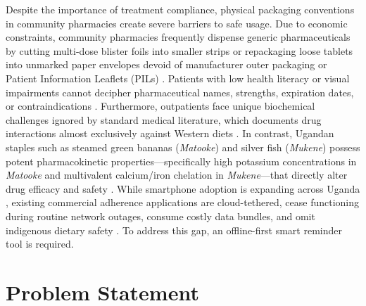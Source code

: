 Despite the importance of treatment compliance, physical packaging conventions in community pharmacies create severe barriers to safe usage. Due to economic constraints, community pharmacies frequently dispense generic pharmaceuticals by cutting multi-dose blister foils into smaller strips or repackaging loose tablets into unmarked paper envelopes devoid of manufacturer outer packaging or Patient Information Leaflets (PILs) \cite{who2017medication, nda2024register}. Patients with low health literacy or visual impairments cannot decipher pharmaceutical names, strengths, expiration dates, or contraindications \cite{parker2016health}. Furthermore, outpatients face unique biochemical challenges ignored by standard medical literature, which documents drug interactions almost exclusively against Western diets \cite{bushra2011food, bailey2013grapefruit}. In contrast, Ugandan staples such as steamed green bananas (\textit{Matooke}) and silver fish (\textit{Mukene}) possess potent pharmacokinetic properties---specifically high potassium concentrations in \textit{Matooke} and multivalent calcium/iron chelation in \textit{Mukene}---that directly alter drug efficacy and safety \cite{fao2019food, bushra2011food}. While smartphone adoption is expanding across Uganda \cite{dayer2013smartphone}, existing commercial adherence applications are cloud-tethered, cease functioning during routine network outages, consume costly data bundles, and omit indigenous dietary safety \cite{kintu2021development}. To address this gap, an offline-first smart reminder tool is required.

\section{Problem Statement}

